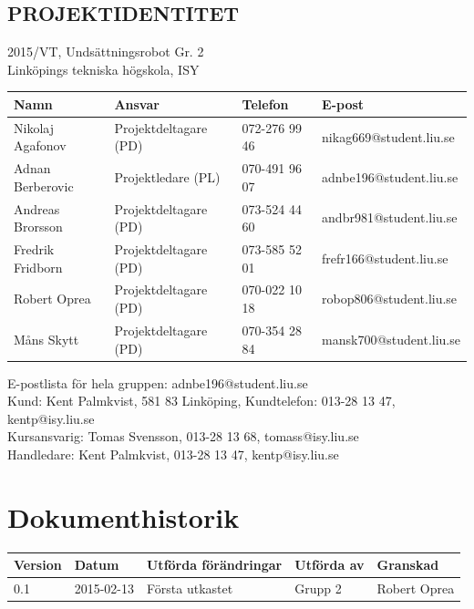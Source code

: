 \documentclass[11pt]{article}
\begin{document}
\pagebreak
\begin{center}

\section*{PROJEKTIDENTITET}
2015/VT, Undsättningsrobot Gr. 2
\\
Linköpings tekniska högskola, ISY
\\[0.5in]
\begin{table}[h]
\begin{tabular}{|l|l|l|l|} \hline
Namn & Ansvar & Telefon & E-post \\[0.1in] \hline
Nikolaj Agafonov & Projektdeltagare (PD) & 072-276 99 46 & nikag669@student.liu.se \\ \hline
Adnan Berberovic & Projektledare (PL) & 070-491 96 07 & adnbe196@student.liu.se \\ \hline
Andreas Brorsson & Projektdeltagare (PD) & 073-524 44 60 & andbr981@student.liu.se \\ \hline
Fredrik Fridborn & Projektdeltagare (PD) & 073-585 52 01 & frefr166@student.liu.se \\ \hline
Robert Oprea & Projektdeltagare (PD) & 070-022 10 18 & robop806@student.liu.se \\ \hline
Måns Skytt & Projektdeltagare (PD) & 070-354 28 84 & mansk700@student.liu.se \\ \hline
\end{tabular}
\end{table}

E-postlista för hela gruppen: adnbe196@student.liu.se
\\[1in]
Kund: Kent Palmkvist, 581 83 Linköping,
Kundtelefon: 013-28 13 47, kentp@isy.liu.se
\\[1in]
Kursansvarig: Tomas Svensson, 013-28 13 68, tomass@isy.liu.se
\\
Handledare: Kent Palmkvist, 013-28 13 47, kentp@isy.liu.se
\end{center}
\pagebreak

\tableofcontents

\pagebreak

\section*{Dokumenthistorik}
\begin{table}[h]
\begin{tabular}{|l|l|l|l|l|} \hline

Version & 
Datum & 
Utförda förändringar & 
Utförda av & 
Granskad \\[0.1in] \hline
0.1 &
2015-02-13 & 
Första utkastet & 
Grupp 2 & 
Robert Oprea \\ \hline

\end{tabular}
\end{table}
\end{document}
